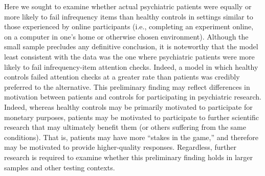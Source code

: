 \documentclass[a4paper,notitlepage,12pt]{article}
\begin{document}
Here we sought to examine whether actual psychiatric patients were equally or more likely to fail infrequency items than healthy controls in settings similar to those experienced by online participants (i.e., completing an experiment online, on a computer in one's home or otherwise chosen environment). Although the small sample precludes any definitive conclusion, it is noteworthy that the model least consistent with the data was the one where psychiatric patients were more likely to fail infrequency-item attention checks. Indeed, a model in which healthy controls failed attention checks at a greater rate than patients was credibly preferred to the alternative. This preliminary finding may reflect differences in motivation between patients and controls for participating in psychiatric research. Indeed, whereas healthy controls may be primarily motivated to participate for monetary purposes, patients may be motivated to participate to further scientific research that may ultimately benefit them (or others suffering from the same conditions). That is, patients may have more ``stakes in the game,'' and therefore may be motivated to provide higher-quality responses. Regardless, further research is required to examine whether this preliminary finding holds in larger samples and other testing contexts. 

\printbibliography[title=Supplementary References]
\end{document}
